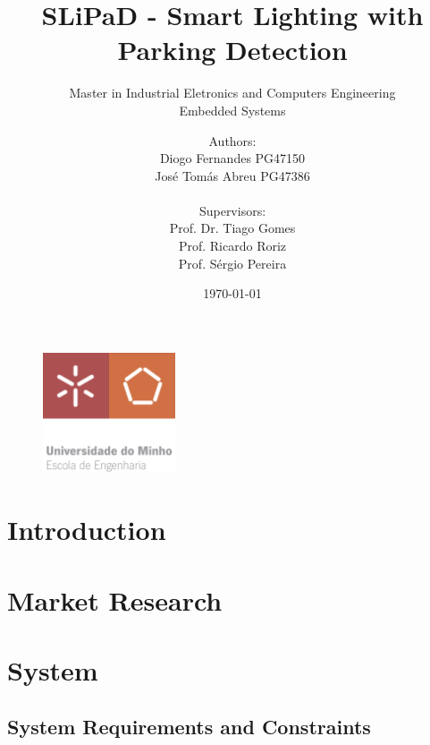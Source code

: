 \documentclass[12pt, letterpaper]{report}
\title{\textbf{SLiPaD - Smart Lighting with Parking Detection}}
\subtitle{{\large Master in Industrial Eletronics and Computers Engineering} \\ {\large Embedded Systems}}
\author{Authors:\\Diogo Fernandes PG47150\\José Tomás Abreu PG47386\\ \\ Supervisors:\\Prof. Dr. Tiago Gomes\\Prof. Ricardo Roriz\\Prof. Sérgio Pereira}
\date{\today}
\begin{document}
{\begin{figure}[t]
	\centering
	\includegraphics[width=0.35\textwidth]{EEUMLOGO}
\end{figure}}

\maketitle

\cleardoublepage
\pagestyle{empty}

\tableofcontents
\clearpage

\clearpage
{}\listoffigures

\clearpage
{}\listoftables

\clearpage
{}
\printacronyms

\newpage


\pagestyle{IHA-fancy-style}
\chapter{Introduction}


\chapter{Market Research}


\chapter{System}

\section{System Requirements and Constraints}
\label{subsection:requirements_constraints}

\end{document}

